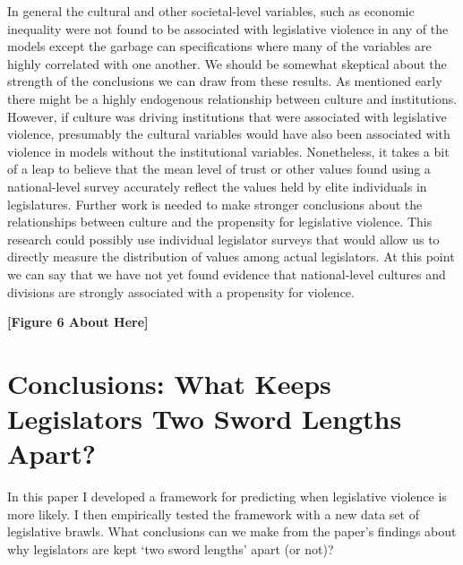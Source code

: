 \documentclass[a4paper]{article}\usepackage{graphicx, color}
\begin{document}
In general the cultural and other societal-level variables, such as economic inequality were not found to be associated with legislative violence in any of the models except the garbage can specifications where many of the variables are highly correlated with one another. We should be somewhat skeptical about the strength of the conclusions we can draw from these results. As mentioned early there might be a highly endogenous relationship between culture and institutions. However, if culture was driving institutions that were associated with legislative violence, presumably the cultural variables would have also been associated with violence in models without the institutional variables. Nonetheless, it takes a bit of a leap to believe that the mean level of trust or other values found using a national-level survey accurately reflect the values held by elite individuals in legislatures. Further work is needed to make stronger conclusions about the relationships between culture and the propensity for legislative violence. This research could possibly use individual legislator surveys that would allow us to directly measure the distribution of values among actual legislators. At this point we can say that we have not yet found evidence that national-level cultures and divisions are strongly associated with a propensity for violence.  

\begin{center}

    {\bf{[Figure 6 About Here]}}

\end{center}

\section*{Conclusions: What Keeps Legislators Two Sword Lengths Apart?}

In this paper I developed a framework for predicting when legislative violence is more likely. I then empirically tested the framework with a new data set of legislative brawls. What conclusions can we make from the paper's findings about why legislators are kept `two sword lengths' apart (or not)?
\end{document}
